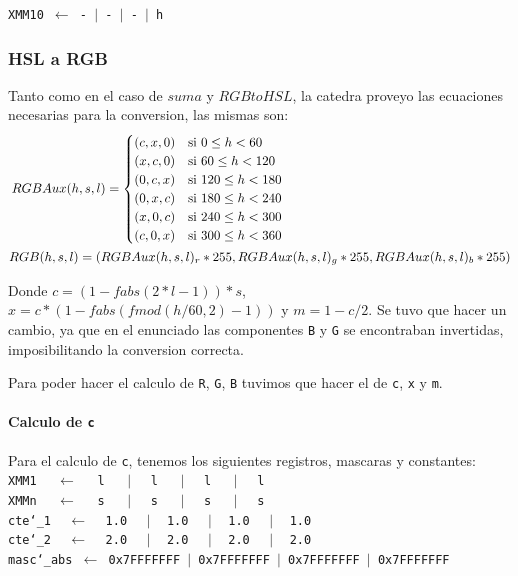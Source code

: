 \noindent
\texttt{XMM10  $\gets$ - $\vert$ - $\vert$ - $\vert$ h}\\

\subsubsection{HSL a RGB}

Tanto como en el caso de $suma$ y $RGBtoHSL$, la catedra proveyo las ecuaciones necesarias para la conversion, las mismas son:\\

\begin{align*}
RGBAux(h, s, l) =
\begin{cases}
(c,x,0) &\mbox{si}\ 0 \leq h < 60\\
(x,c,0) &\mbox{si}\ 60 \leq h < 120\\
(0,c,x) &\mbox{si}\ 120 \leq h < 180\\
(0,x,c) &\mbox{si}\ 180 \leq h < 240\\
(x,0,c) &\mbox{si}\ 240 \leq h < 300\\
(c,0,x) &\mbox{si}\ 300 \leq h < 360
\end{cases}
\hspace{62mm}
\\
RGB(h,s,l) = (RGBAux(h,s,l)_r * 255, RGBAux(h,s,l)_g * 255, RGBAux(h,s,l)_b * 255)
\end{align*}

Donde $c = (1 - fabs(2*l - 1))*s$, $x = c*(1 - fabs(fmod(h/60, 2) - 1))$ y $m = 1 - c/2$. Se tuvo que hacer un cambio, ya que en el enunciado las componentes \texttt{B} y \texttt{G} se encontraban invertidas, imposibilitando la conversion correcta.

Para poder hacer el calculo de \texttt{R}, \texttt{G}, \texttt{B} tuvimos que hacer el de \texttt{c}, \texttt{x} y \texttt{m}.

\paragraph{Calculo de \texttt{c}\newline}

Para el calculo de \texttt{c}, tenemos los siguientes registros, mascaras y constantes:\\

\noindent
\texttt{XMM1 $\ \ \ \ \gets \ \ \ \ $ l $\ \ \ \ \ \vert\ \ \ \ $ l $\ \ \ \ \ \vert\ \ \ \ $ l  $\ \ \ \ \ \vert\ \ \ \ $ l}\\
\texttt{XMMn $\ \ \ \ \gets \ \ \ \ $ s $\ \ \ \ \ \vert\ \ \ \ $ s $\ \ \ \ \ \vert\ \ \ \ $ s  $\ \ \ \ \ \vert\ \ \ \ $ s}\\
\texttt{cte\char`_1 $\ \ \ \gets\ \ \ $ 1.0 $\ \ \ \ \vert\ \ \ $ 1.0 $\ \ \ \ \vert\ \ \ $ 1.0 $\ \ \ \ \vert\ \ \ $ 1.0}\\
\texttt{cte\char`_2 $\ \ \ \gets\ \ \ $ 2.0 $\ \ \ \ \vert\ \ \ $ 2.0 $\ \ \ \ \vert\ \ \ $ 2.0 $\ \ \ \ \vert \ \ \ $ 2.0}\\
\texttt{masc\char`_abs $\gets$ 0x7FFFFFFF $\vert$ 0x7FFFFFFF $\vert$ 0x7FFFFFFF $\vert$ 0x7FFFFFFF}\\

